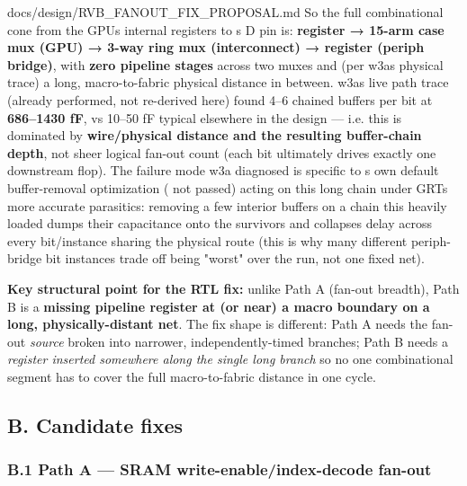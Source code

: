 \begin{relocated}{docs/design/RVB_FANOUT_FIX_PROPOSAL.md}
So the full combinational cone from the GPU\textquotesingle s internal
registers to \textquotesingle s  D
pin is: \textbf{register → 15-arm case mux (GPU) → 3-way ring mux
(interconnect) → register (periph bridge)}, with \textbf{zero pipeline
stages} across two muxes and (per w3a\textquotesingle s physical trace)
a long, macro-to-fabric physical distance in between.
w3a\textquotesingle s live path trace (already performed, not re-derived
here) found 4--6 chained buffers per bit at \textbf{686--1430 fF}, vs
10--50 fF typical elsewhere in the design --- i.e. this is dominated by
\textbf{wire/\allowbreak{}physical distance and the resulting
buffer-chain depth}, not sheer logical fan-out count (each 
bit ultimately drives exactly one downstream flop). The failure mode w3a
diagnosed is specific to \textquotesingle s own
default buffer-removal optimization ( not
passed) acting on this long chain under GRT\textquotesingle s more
accurate parasitics: removing a few interior buffers on a chain this
heavily loaded dumps their capacitance onto the survivors and collapses
delay across every bit/\allowbreak{}instance sharing the physical route
(this is why many different  periph-bridge
bit instances trade off being "worst" over the run, not one fixed net).

\textbf{Key structural point for the RTL fix:} unlike Path A (fan-out
breadth), Path B is a \textbf{missing pipeline register at (or near) a
macro boundary on a long, physically-distant net}. The fix shape is
different: Path A needs the fan-out \emph{source} broken into narrower,
independently-timed branches; Path B needs a \emph{register inserted
somewhere along the single long branch} so no one combinational segment
has to cover the full macro-to-fabric distance in one cycle.

\subsection{B. Candidate fixes}\label{tm:pd:rvb-fanout-fix:b-candidate-fixes}

\subsubsection{\texorpdfstring{B.1 Path A --- SRAM
write-enable/\allowbreak{}index-decode
fan-out}{B.1 Path A --- SRAM write-enable/index-decode fan-out}}\label{tm:pd:rvb-fanout-fix:b1-path-a-sram-write-enableindex-decode-fan-out}


\end{relocated}
